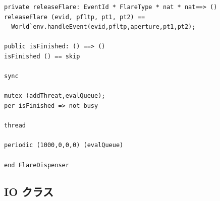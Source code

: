 \documentclass[\pformat,12pt]{jreport}
\begin{document}
\begin{lstlisting}
private releaseFlare: EventId * FlareType * nat * nat==> ()
releaseFlare (evid, pfltp, pt1, pt2) == 
  World`env.handleEvent(evid,pfltp,aperture,pt1,pt2);

public isFinished: () ==> ()
isFinished () == skip

sync

mutex (addThreat,evalQueue);
per isFinished => not busy

thread

periodic (1000,0,0,0) (evalQueue)

end FlareDispenser
\end{lstlisting}

\subsection{IO クラス}
\end{document}
